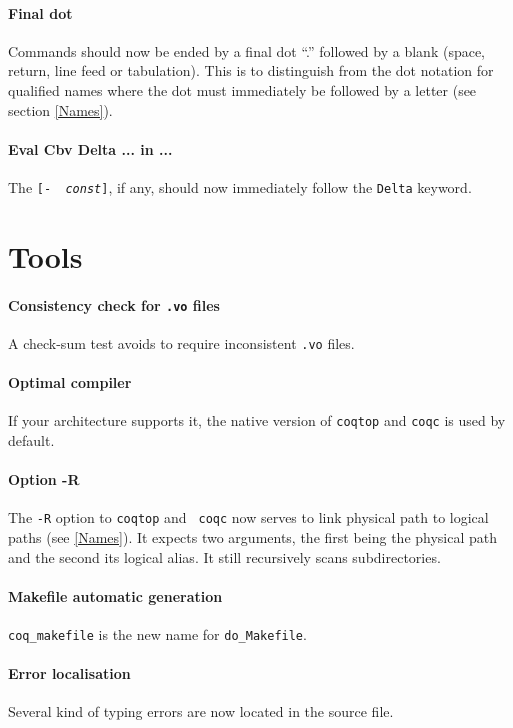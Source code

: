 \documentclass[11pt]{article}
\begin{document}
\paragraph{Final dot} Commands should now be ended by a final dot ``.'' followed by a blank
(space, return, line feed or tabulation). This is to distinguish from
the dot notation for qualified names where the dot must immediately be
followed by a letter (see section \ref{Names}).

\paragraph{Eval Cbv Delta ... in ...} The {\tt [- {\it
const}]}, if any, should now immediately follow the {\tt Delta} keyword.


\section{Tools}
\label{Tools}

\paragraph{Consistency check for {\tt .vo} files} A check-sum test
avoids to require inconsistent {\tt .vo} files.

\paragraph{Optimal compiler} If your architecture supports it, the native
version of {\tt coqtop} and {\tt coqc} is used by default.

\paragraph{Option -R} The {\tt -R} option to {\tt coqtop} and {\tt
coqc} now serves to link physical path to logical paths (see
\ref{Names}). It expects two arguments, the first being the physical
path and the second its logical alias. It still recursively scans
subdirectories.

\paragraph{Makefile automatic generation} {\tt coq\_makefile} is the
new name for {\tt do\_Makefile}.

\paragraph{Error localisation} Several kind of typing errors are now
located in the source file.
\end{document}
